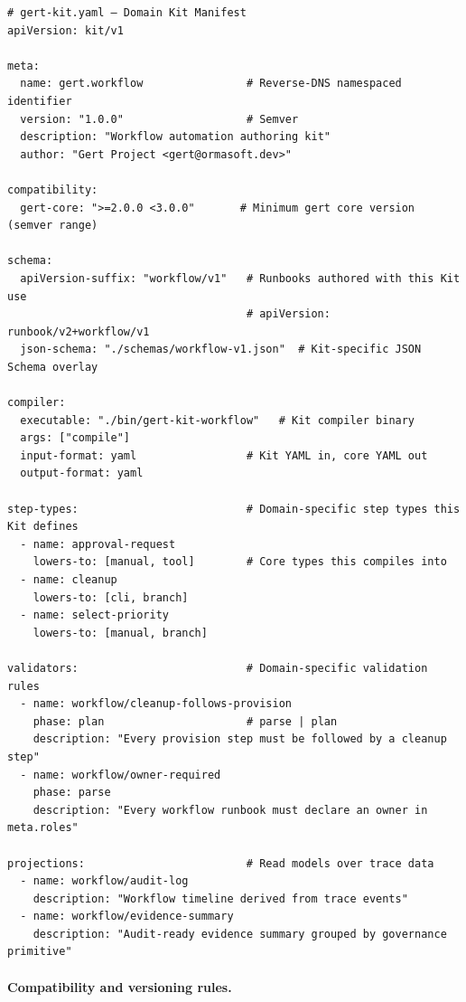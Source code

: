 \begin{verbatim}
# gert-kit.yaml — Domain Kit Manifest
apiVersion: kit/v1

meta:
  name: gert.workflow                # Reverse-DNS namespaced identifier
  version: "1.0.0"                   # Semver
  description: "Workflow automation authoring kit"
  author: "Gert Project <gert@ormasoft.dev>"

compatibility:
  gert-core: ">=2.0.0 <3.0.0"       # Minimum gert core version (semver range)

schema:
  apiVersion-suffix: "workflow/v1"   # Runbooks authored with this Kit use
                                     # apiVersion: runbook/v2+workflow/v1
  json-schema: "./schemas/workflow-v1.json"  # Kit-specific JSON Schema overlay

compiler:
  executable: "./bin/gert-kit-workflow"   # Kit compiler binary
  args: ["compile"]
  input-format: yaml                 # Kit YAML in, core YAML out
  output-format: yaml

step-types:                          # Domain-specific step types this Kit defines
  - name: approval-request
    lowers-to: [manual, tool]        # Core types this compiles into
  - name: cleanup
    lowers-to: [cli, branch]
  - name: select-priority
    lowers-to: [manual, branch]

validators:                          # Domain-specific validation rules
  - name: workflow/cleanup-follows-provision
    phase: plan                      # parse | plan
    description: "Every provision step must be followed by a cleanup step"
  - name: workflow/owner-required
    phase: parse
    description: "Every workflow runbook must declare an owner in meta.roles"

projections:                         # Read models over trace data
  - name: workflow/audit-log
    description: "Workflow timeline derived from trace events"
  - name: workflow/evidence-summary
    description: "Audit-ready evidence summary grouped by governance primitive"
\end{verbatim}

\paragraph{Compatibility and versioning rules.}

